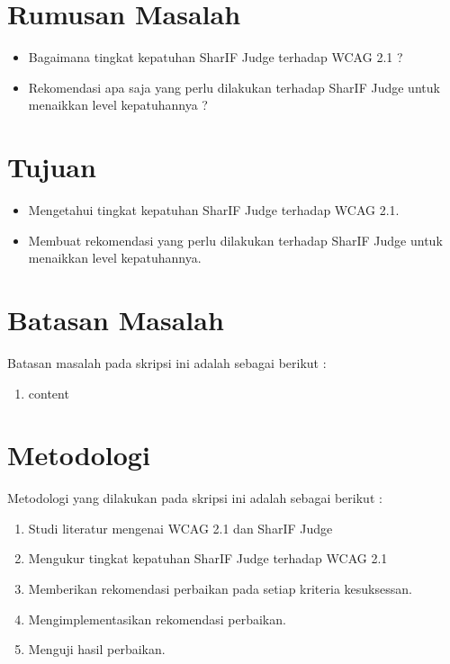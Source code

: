 \section{Rumusan Masalah}
\label{sec:rumusan}
\begin{itemize}
	\item Bagaimana tingkat kepatuhan SharIF Judge terhadap WCAG 2.1 ?
	\item Rekomendasi apa saja yang perlu dilakukan terhadap SharIF Judge untuk menaikkan level kepatuhannya ?
\end{itemize}

\section{Tujuan}
\label{sec:tujuan}
\begin{itemize}
	\item Mengetahui tingkat kepatuhan SharIF Judge terhadap WCAG 2.1.
	\item Membuat rekomendasi yang perlu dilakukan terhadap SharIF Judge untuk menaikkan level kepatuhannya.
\end{itemize} 

\section{Batasan Masalah}
\label{sec:batasan}
Batasan masalah pada skripsi ini adalah sebagai berikut :

\begin{enumerate}
	\item content
\end{enumerate}

\section{Metodologi}
\label{sec:metlit}
Metodologi yang dilakukan pada skripsi ini adalah sebagai berikut :

\begin{enumerate}
	\item Studi literatur mengenai WCAG 2.1 dan SharIF Judge
	\item Mengukur tingkat kepatuhan SharIF Judge terhadap WCAG 2.1
	\item Memberikan rekomendasi perbaikan pada setiap kriteria kesuksessan.
	\item Mengimplementasikan rekomendasi perbaikan.
	\item Menguji hasil perbaikan.
\end{enumerate}

